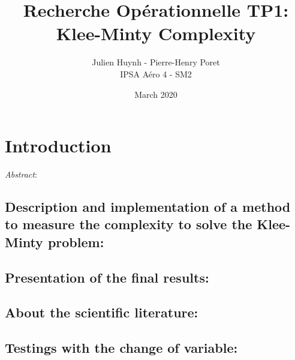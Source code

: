 \documentclass[twocolumns]{article}
\title{Recherche Opérationnelle TP1: Klee-Minty Complexity}
\author{Julien Huynh - Pierre-Henry Poret \\
        IPSA Aéro 4 - SM2}
\date{March 2020}
\begin{document}
\maketitle



\section{Introduction}

\textit{Abstract}:  

\subsection{Description and implementation of a method to measure the complexity to solve the Klee-Minty problem:}

\subsection{Presentation of the final results:}

\subsection{About the scientific literature:}

\subsection{Testings with the change of variable:}
\end{document}
